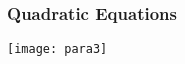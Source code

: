  \begin{frame}[fragile]\frametitle{Quadratic Equations}
\begin{center}
\texttt{[image: para3]}
\end{center}

\end{frame}

